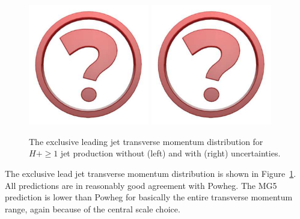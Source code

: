 \begin{figure}[t!]
  \centering
  \includegraphics[width=0.47\textwidth]{Micon.pdf}
  \hfill
  \includegraphics[width=0.47\textwidth]{Micon.pdf}
  \caption{
    The exclusive leading jet transverse momentum distribution for
    $H+\ge1$ jet production without (left) and with (right) uncertainties.
    \label{fig:higgscomp:results:1obs:j1pt_excl}
  }
\end{figure}

The exclusive lead jet transverse momentum distribution is shown in
Figure~\ref{fig:higgscomp:results:1obs:j1pt_excl}. All predictions are
in reasonably good agreement with Powheg. The MG5 prediction is lower
than Powheg for basically the entire transverse momentum range, again
because of the central scale choice.

